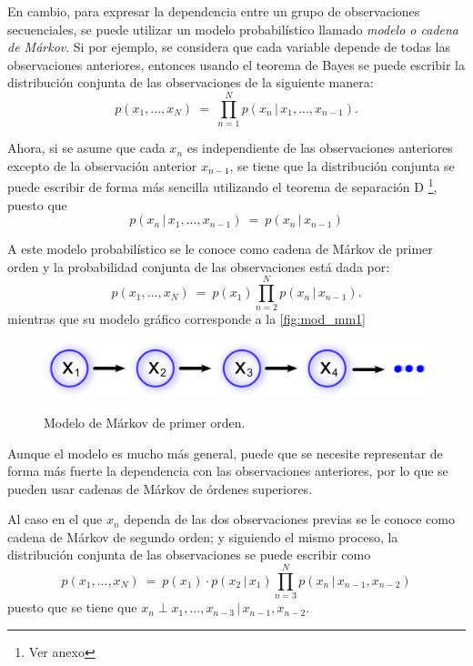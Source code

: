 En cambio, para expresar la dependencia entre un grupo de observaciones secuenciales, se puede utilizar un modelo probabilístico llamado \textit{modelo o cadena de Márkov}. Si por ejemplo, se considera que cada variable depende de todas las observaciones anteriores, entonces usando el teorema de Bayes
se puede escribir la distribución conjunta de las observaciones de la siguiente manera:
\begin{equation}
\label{eqn:2-2}
p(x_1, ..., x_N) ~=~ \prod_{n=1}^N p(x_n \,|\, x_1, ..., x_{n-1}).
\end{equation}

Ahora, si se asume que cada $x_n$ es independiente de las observaciones anteriores excepto de la observación anterior $x_{n-1}$, se tiene que la distribución conjunta se puede escribir de forma más sencilla utilizando el teorema de separación D \footnote{Ver anexo}, puesto que 
\begin{equation}
\label{eqn:2-3}
p(x_n \,|\, x_1, ..., x_{n-1}) ~=~ p(x_n \,|\, x_{n-1})
\end{equation}

A este modelo probabilístico se le conoce como cadena de Márkov de primer orden y la probabilidad conjunta de las observaciones está dada por:
\begin{equation}
\label{eqn:2-4}
p(x_1, ..., x_N) ~=~ p(x_1) \prod_{n=2}^N p(x_n \,|\, x_{n-1}).
\end{equation}
mientras que su modelo gráfico corresponde a la \autoref{fig:mod_mm1}
\begin{figure}[bt]
        \myfloatalign
        {\includegraphics[width=0.6\linewidth]{gfx/chap2/mod-mm1}}
        \caption{Modelo de Márkov de primer orden.}
        \label{fig:mod_mm1}
\end{figure}

Aunque el modelo es mucho más general, puede que se necesite representar de forma más fuerte la dependencia con las observaciones anteriores, por lo que se pueden usar cadenas de Márkov de órdenes superiores.

Al caso en el que $x_n$ dependa de las dos observaciones previas se le conoce como cadena de Márkov de segundo orden; y siguiendo el mismo proceso, la distribución conjunta de las observaciones se puede escribir como 
\begin{equation}
\label{eqn:2-5}
p(x_1, ..., x_N) ~=~ p(x_1) \cdot p(x_2 \,|\, x_1) 
        \prod_{n=3}^N p(x_n \,|\, x_{n-1}, x_{n-2})
\end{equation}
puesto que se tiene que $x_n \perp x_1, ..., x_{n-3} \,|\, x_{n-1}, x_{n-2}$.

